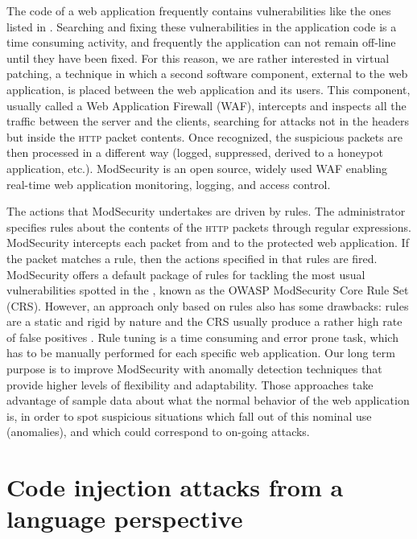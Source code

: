 \documentclass[runningheads,a4paper]{llncs}
\newcommand{\HTTP}{\textsc{http}\xspace}
\begin{document}
The code of a web application frequently contains vulnerabilities like the ones listed in \cite{OWASPTop10}. Searching and fixing these vulnerabilities in the application code is a time consuming activity, and frequently the application can not remain off-line until they have been fixed. For this reason, we are rather interested in virtual patching, a technique in which a second software component, external to the web application, is placed between the web application and its users. This component, usually called a Web Application Firewall (WAF), intercepts and inspects all the traffic between the server and the clients, searching for attacks not in the headers but inside the \HTTP packet contents. Once recognized, the suspicious packets are then processed in a different way (logged, suppressed, derived to a honeypot application, etc.). ModSecurity \cite{ModSecurity} is an open source, widely used WAF enabling real-time web application monitoring, logging, and access control. 

The actions that ModSecurity undertakes are driven by rules. The administrator specifies rules about the contents of the \HTTP packets through regular expressions. ModSecurity intercepts each packet from and to the protected web application. If the packet matches a rule, then the actions specified in that rules are fired. ModSecurity offers a default package of rules for tackling the most usual vulnerabilities spotted in the \cite{OWASPTop10}, known as the OWASP ModSecurity Core Rule Set (CRS). However, an approach only based on rules also has some drawbacks: rules are a static and rigid by nature and the CRS usually produce a rather high rate of false positives \cite{ModSecurityFalseRate}. Rule tuning is a time consuming and error prone task, which has to be manually performed for each specific web application. Our long term purpose is to improve ModSecurity with anomally detection techniques that provide higher levels of flexibility and adaptability. Those approaches take advantage of sample data about what the normal behavior of the web application is, in order to spot suspicious situations which fall out of this nominal use (anomalies), and which could correspond to on-going attacks. 

\section{Code injection attacks from a language perspective}
\end{document}
